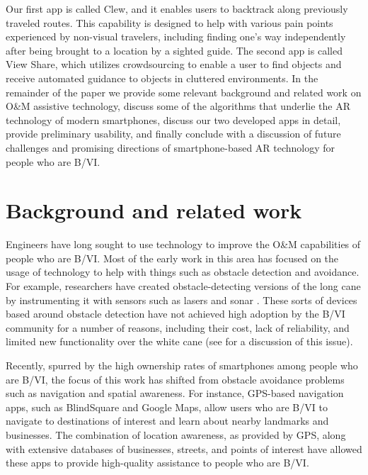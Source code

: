 \documentclass[chi_draft]{sigchi}
\newcommand{\BVI}{B/VI\xspace}
\newcommand{\OM}{O\&M\xspace}
\begin{document}
Our first app is called Clew, and it enables users to backtrack along previously traveled routes.  This capability is designed to help with various pain points experienced by non-visual travelers, including finding one's way independently after being brought to a location by a sighted guide.  The second app is called View Share, which utilizes crowdsourcing to enable a user to find objects and receive automated guidance to objects in cluttered environments.  In the remainder of the paper we provide some relevant background and related work on \OM assistive technology, discuss some of the algorithms that underlie the AR technology of modern smartphones, discuss our two developed apps in detail, provide preliminary usability, and finally conclude with a discussion of future challenges and promising directions of smartphone-based AR technology for people who are \BVI.   

\section{Background and related work}
Engineers have long sought to use technology to improve the \OM capabilities of people who are \BVI.  Most of the early work in this area has focused on the usage of technology to help with things such as obstacle detection and avoidance.  For example, researchers have created obstacle-detecting versions of the long cane by instrumenting it with sensors such as lasers \cite{benjamin1973new} and sonar \cite{borenstein1997guidecane}.  These sorts of devices based around obstacle detection have not achieved high adoption by the \BVI community for a number of reasons, including their cost, lack of reliability, and limited new functionality over the white cane (see \cite{wiener2010foundations} for a discussion of this issue).

Recently, spurred by the high ownership rates of smartphones among people who are \BVI, the focus of this work has shifted from obstacle avoidance problems such as navigation and spatial awareness.  For instance, GPS-based navigation apps, such as BlindSquare \cite{blindsquare} and Google Maps, allow users who are \BVI to navigate to destinations of interest and learn about nearby landmarks and businesses.  The combination of location awareness, as provided by GPS, along with extensive databases of businesses, streets, and points of interest have allowed these apps to provide high-quality assistance to people who are \BVI.
\end{document}
